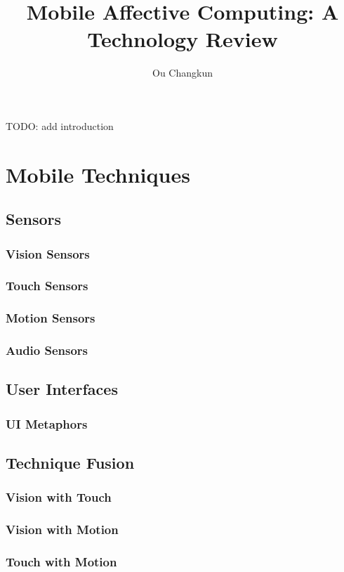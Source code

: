 \documentclass[journal]{vgtc}
\title{Mobile Affective Computing: A Technology Review}
\author{Ou Changkun}
\begin{document}
\maketitle
TODO: add introduction

\section{Mobile Techniques}
\subsection{Sensors}
\subsubsection{Vision Sensors}
\subsubsection{Touch Sensors}
\subsubsection{Motion Sensors}
\subsubsection{Audio Sensors}

\subsection{User Interfaces}
\subsubsection{UI Metaphors}

\subsection{Technique Fusion}
\subsubsection{Vision with Touch}
\subsubsection{Vision with Motion}
\subsubsection{Touch with Motion}
\end{document}
